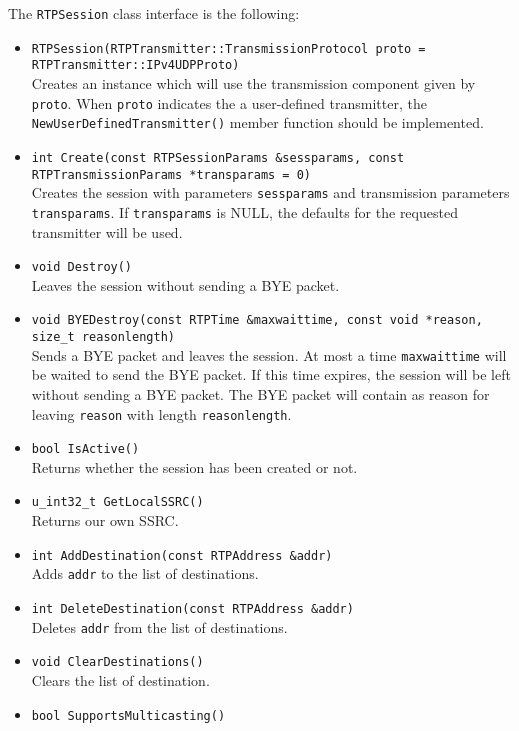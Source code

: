 \documentclass[12pt,a4paper]{article}
\begin{document}
				The {\tt RTPSession} class interface is the following:
				\begin{itemize}
					\item {\tt RTPSession(RTPTransmitter::Transmission\-Protocol proto = RTP\-Trans\-mitter::IPv4\-UDPProto)}\\
						Creates an instance which will use the transmission component given
						by {\tt proto}. When {\tt proto} indicates the a user-defined
						transmitter, the {\tt NewUserDefinedTransmitter()} member
						function should be implemented.
					\item {\tt int Create(const RTPSessionParams \&sessparams, const RTPTransmissionParams *transparams = 0)}\\
						Creates the session with parameters {\tt sessparams} and transmission parameters {\tt transparams}.
						If {\tt transparams} is NULL, the defaults for the requested transmitter will
						be used.
					\item {\tt void Destroy()}\\
						Leaves the session without sending a BYE packet.
					\item {\tt void BYEDestroy(const RTPTime \&maxwaittime, const void *reason, size\_t reasonlength)}\\
						Sends a BYE packet and leaves the session. At most a time {\tt maxwaittime} will
						be waited to send the BYE packet. If this time expires, the session will be
						left without sending a BYE packet. The BYE packet will contain as reason for
						leaving {\tt reason} with length {\tt reasonlength}.
					\item {\tt bool IsActive()}\\
						Returns whether the session has been created or not.
					\item {\tt u\_int32\_t GetLocalSSRC()}\\
						Returns our own SSRC.
					\item {\tt int AddDestination(const RTPAddress \&addr)}\\
						Adds {\tt addr} to the list of destinations.
					\item {\tt int DeleteDestination(const RTPAddress \&addr)}\\
						Deletes {\tt addr} from the list of destinations.
					\item {\tt void ClearDestinations()}\\
						Clears the list of destination.
					\item {\tt bool SupportsMulticasting()}\\

\end{itemize}
\end{document}
